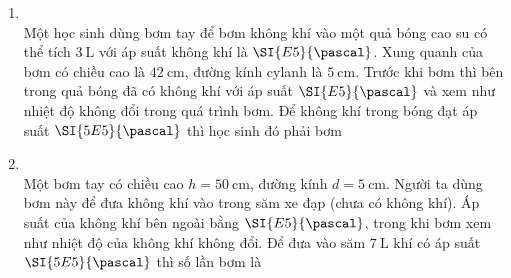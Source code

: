 \begin{enumerate}[label=\bfseries Câu \arabic*:, leftmargin=1.7cm]
\item {}\\
Một học sinh dùng bơm tay để bơm không khí vào một quả bóng cao su có thể tích $\SI{3}{\liter}$ với áp suất không khí là $\SI{E5}{\pascal}$. Xung quanh của bơm có chiều cao là $\SI{42}{\centi\meter}$, đường kính cylanh là $\SI{5}{\centi\meter}$. Trước khi bơm thì bên trong quả bóng đã có không khí với áp suất $\SI{E5}{\pascal}$ và xem như nhiệt độ không đổi trong quá trình bơm. Để không khí trong bóng đạt áp suất $\SI{5E5}{\pascal}$ thì học sinh đó phải bơm

\item {}\\
Một bơm tay có chiều cao $h=\SI{50}{\centi\meter}$, đường kính $d=\SI{5}{\centi\meter}$. Người ta dùng bơm này để đưa không khí vào trong săm xe đạp (chưa có không khí). Áp suất của không khí bên ngoài bằng $\SI{E5}{\pascal}$, trong khi bơm xem như nhiệt độ của không khí không đổi. Để đưa vào săm $\SI{7}{\liter}$ khí có áp suất $\SI{5E5}{\pascal}$ thì số lần bơm là


\end{enumerate}

